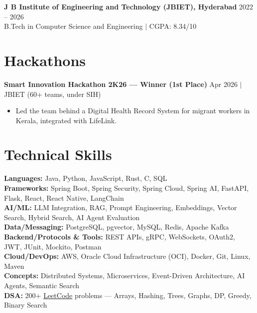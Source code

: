 \documentclass[letterpaper,10pt]{article}
\begin{document}
\textbf{J B Institute of Engineering and Technology (JBIET), Hyderabad} \hfill 2022 -- 2026 \\
B.Tech in Computer Science and Engineering $|$ CGPA: 8.34/10
\vspace{-4pt}


\section{Hackathons}

\textbf{Smart Innovation Hackathon 2K26 --- Winner (1st Place)} \hfill Apr 2026 $|$ JBIET (60+ teams, under SIH)

\begin{itemize}[leftmargin=*, itemsep=0pt, topsep=1pt]
\item Led the team behind a Digital Health Record System for migrant workers in Kerala, integrated with LifeLink.
\end{itemize}

\vspace{-4pt}


\section{Technical Skills}
\textbf{Languages:} Java, Python, JavaScript, Rust, C, SQL \\
\textbf{Frameworks:} Spring Boot, Spring Security, Spring Cloud, Spring AI, FastAPI, Flask, React, React Native, LangChain \\
\textbf{AI/ML:} LLM Integration, RAG, Prompt Engineering, Embeddings, Vector Search, Hybrid Search, AI Agent Evaluation \\
\textbf{Data/Messaging:} PostgreSQL, pgvector, MySQL, Redis, Apache Kafka \\
\textbf{Backend/Protocols \& Tools:} REST APIs, gRPC, WebSockets, OAuth2, JWT, JUnit, Mockito, Postman \\
\textbf{Cloud/DevOps:} AWS, Oracle Cloud Infrastructure (OCI), Docker, Git, Linux, Maven \\
\textbf{Concepts:} Distributed Systems, Microservices, Event-Driven Architecture, AI Agents, Semantic Search \\
\textbf{DSA:} 200+ \href{https://leetcode.com/u/Adepu_Sri_Charan/}{LeetCode} problems --- Arrays, Hashing, Trees, Graphs, DP, Greedy, Binary Search
\end{document}
